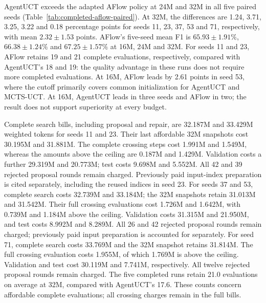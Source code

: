 AgentUCT exceeds the adapted AFlow policy at 24M and 32M in all five paired
seeds (Table~\ref{tab:completed-aflow-paired}). At 32M, the differences are
1.24, 3.71, 3.25, 3.22 and 0.18 percentage points for seeds
11, 23, 37, 53 and 71, respectively, with mean $2.32\pm1.53$ points.
AFlow's five-seed mean F1 is $65.93\pm1.91\%$, $66.38\pm1.24\%$
and $67.25\pm1.57\%$ at 16M, 24M and 32M.
For seeds 11 and 23, AFlow retains 19 and 21 complete evaluations, respectively,
compared with AgentUCT's 18 and 19: the quality advantage in these runs does
not require more completed evaluations. At 16M, AFlow leads by 2.61 points
in seed 53, where the cutoff primarily covers common initialization for
AgentUCT and MCTS-UCT. At 16M, AgentUCT leads in three seeds and AFlow
in two; the result does not support superiority at every budget.

\begin{table}[t]
\centering\small
\caption{Completed paired AFlow--RAG comparisons. Entries are primary test
F1 in percent under the common actual search-budget ceiling and Top5
validation protocol. The methods are compared directly by their test F1.
All five matched seeds are shown; repeated budget endpoints are not
independent measurements.}
\label{tab:completed-aflow-paired}

\end{table}

Complete search bills, including proposal and repair, are 32.187M and
33.429M weighted tokens for seeds 11 and 23. Their last affordable 32M
snapshots cost 30.195M and 31.881M. The complete crossing steps cost 1.991M
and 1.549M, whereas the amounts above the ceiling are 0.187M and 1.429M.
Validation costs a further 29.319M and 20.773M; test costs 9.698M and 5.552M.
All 42 and 39 rejected proposal rounds remain charged. Previously paid
input-index preparation is cited separately, including the reused indices
in seed 23.
For seeds 37 and 53, complete search costs 32.739M and 33.184M; the 32M
snapshots retain 31.013M and 31.542M. Their full crossing evaluations cost
1.726M and 1.642M, with 0.739M and 1.184M above the ceiling.
Validation costs 31.315M and 21.950M, and test costs 8.992M and 8.289M.
All 26 and 42 rejected proposal rounds remain charged; previously paid
input preparation is accounted for separately.
For seed 71, complete search costs 33.769M and the 32M snapshot retains
31.814M. The full crossing evaluation costs 1.955M, of which 1.769M is
above the ceiling. Validation and test cost 30.119M and 7.741M,
respectively. All twelve rejected proposal rounds remain charged.
The five completed runs retain 21.0 evaluations on average at 32M,
compared with AgentUCT's 17.6. These counts concern affordable complete
evaluations; all crossing charges remain in the full bills.

